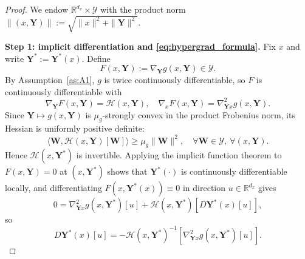 \documentclass[10pt,a4paper]{amsart}
\newcommand{\R}{\mathbb{R}}
\begin{document}
\begin{proof}
We endow $\R^{d_x}\times\mathcal Y$ with the product norm $\|(x,\boldsymbol Y)\|:=\sqrt{\|x\|^2+\|\boldsymbol Y\|^2}$.

\textbf{Step 1: implicit differentiation and \eqref{eq:hypergrad_formula}. }
Fix $x$ and write $\boldsymbol Y^*:=\boldsymbol Y^*(x)$. Define
\begin{equation*}
F(x,\boldsymbol Y):=\nabla_{\boldsymbol Y}g(x,\boldsymbol Y)\in\mathcal Y.
\end{equation*}
By Assumption~\ref{as:A1}, $g$ is twice continuously differentiable, so $F$ is continuously differentiable with
\begin{equation*}
\nabla_{\boldsymbol Y}F(x,\boldsymbol Y)=\mathcal H(x,\boldsymbol Y), \quad \nabla_x F(x,\boldsymbol Y)=\nabla_{\boldsymbol Y x}^2 g(x,\boldsymbol Y).
\end{equation*}
Since $\boldsymbol Y\mapsto g(x,\boldsymbol Y)$ is $\mu_g$-strongly convex in the product Frobenius norm, its Hessian is uniformly positive definite:
\begin{equation}\label{eq:H_sc_product}
\langle \boldsymbol W,\mathcal H(x,\boldsymbol Y)[\boldsymbol W]\rangle
\ge \mu_g \|\boldsymbol W\|^2,
\quad
\forall \boldsymbol W\in\mathcal Y,\ \forall (x,\boldsymbol Y).
\end{equation}
Hence $\mathcal H(x,\boldsymbol Y^*)$ is invertible. Applying the implicit function theorem to $F(x,\boldsymbol Y)=0$ at $(x,\boldsymbol Y^*)$ shows that $\boldsymbol Y^*(\cdot)$ is continuously differentiable locally, and differentiating $F(x,\boldsymbol Y^*(x))\equiv 0$ in direction $u\in\R^{d_x}$ gives
\begin{equation*}
0=\nabla_{\boldsymbol Y x}^2 g(x,\boldsymbol Y^*)[u] +\mathcal H(x,\boldsymbol Y^*)[D\boldsymbol Y^*(x)[u]],
\end{equation*}
so
\begin{equation}\label{eq:DYstar_formula_product}
D\boldsymbol Y^*(x)[u]
=-\mathcal H(x,\boldsymbol Y^*)^{-1}[\nabla_{\boldsymbol Y x}^2 g(x,\boldsymbol Y^*)[u]].
\end{equation}


\end{proof}
\end{document}
